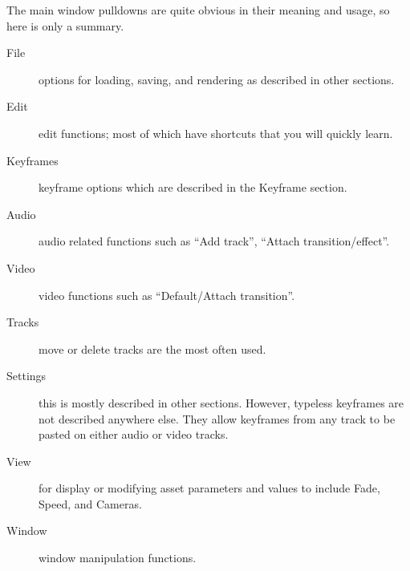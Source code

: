 The main window pulldowns are quite obvious in their meaning and usage, so here is only a summary.  


\begin{description}
    \item[File]  options for loading, saving, and rendering as described in other sections.
    \item[Edit]  edit functions; most of which have shortcuts that you will quickly learn.
    \item[Keyframes]  keyframe options which are described in the Keyframe section.
    \item[Audio]  audio related functions such as “Add track”, “Attach transition/effect”.
    \item[Video]  video functions such as “Default/Attach transition”.
    \item[Tracks]  move or delete tracks are the most often used.
    \item[Settings]  this is mostly described in other sections.  
        However, typeless keyframes are not described
        anywhere else.  
        They allow keyframes from any track to be pasted on either audio or video tracks.
    \item[View]  for display or modifying asset parameters and values to include Fade, Speed, and Cameras.
    \item[Window]  window manipulation functions.
\end{description}
















